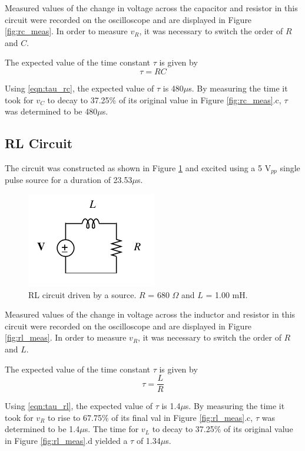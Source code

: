 \documentclass[12pt]{article}
\begin{document}
Measured values of the change in voltage across the capacitor and resistor in this circuit were recorded on the oscilloscope and are displayed in Figure \ref{fig:rc_meas}. In order to measure $v_R$, it was necessary to switch the order of $R$ and $C$.

The expected value of the time constant $\tau$ is given by
\begin{equation}\label{eqn:tau_rc}
	\tau = RC
\end{equation}

Using \eqref{eqn:tau_rc}, the expected value of $\tau$ is 480$\mu$s. By measuring the time it took for $v_C$ to decay to 37.25\% of its original value in Figure \ref{fig:rc_meas}.c, $\tau$ was determined to be 480$\mu$s.

\subsection{RL Circuit}\label{sec:rl}
The circuit was constructed as shown in Figure \ref{fig:rl_circuit} and excited using a 5 V$_{pp}$ single pulse source for a duration of 23.53$\mu$s.

\begin{figure}[h]
	\centering
	\includegraphics[scale = 0.75]{rl_circuit}
	\caption{RL circuit driven by a source. $R$ = 680 $\Omega$ and $L$ = 1.00 mH. }
	\label{fig:rl_circuit}
\end{figure}

Measured values of the change in voltage across the inductor and resistor in this circuit were recorded on the oscilloscope and are displayed in Figure \ref{fig:rl_meas}. In order to measure $v_R$, it was necessary to switch the order of $R$ and $L$.

The expected value of the time constant $\tau$ is given by
\begin{equation}\label{eqn:tau_rl}
	\tau = \frac{L}{R}
\end{equation}

Using \eqref{eqn:tau_rl}, the expected value of $\tau$ is 1.4$\mu$s. By measuring the time it took for $v_R$ to rise to 67.75\% of its final val in Figure \ref{fig:rl_meas}.c, $\tau$ was determined to be 1.4$\mu$s. The time for $v_L$ to decay to 37.25\% of its original value in Figure \ref{fig:rl_meas}.d yielded a $\tau$ of 1.34$\mu$s.
\end{document}

